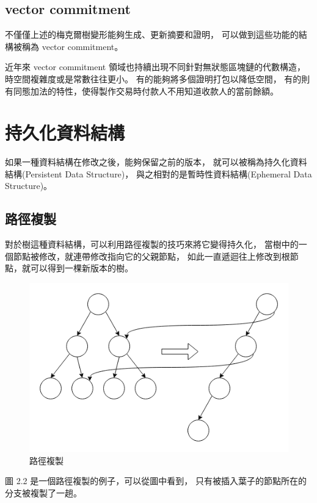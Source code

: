 \subsection{vector commitment}

不僅僅上述的梅克爾樹變形能夠生成、更新摘要和證明，
可以做到這些功能的結構被稱為 vector commitment\cite{catalano2013vector}。

近年來 vector commitment 領域也持續出現不同針對無狀態區塊鏈的代數構造，
時空間複雜度或是常數往往更小。
有的能夠將多個證明打包以降低空間\cite{boneh2019batching}，
有的則有同態加法的特性，使得製作交易時付款人不用知道收款人的當前餘額\cite{chepurnoy2018edrax}。

\section{持久化資料結構}

如果一種資料結構在修改之後，能夠保留之前的版本，
就可以被稱為持久化資料結構\cite{driscoll1986making}(Persistent Data Structure)，
與之相對的是暫時性資料結構(Ephemeral Data Structure)。

\subsection{路徑複製}
對於樹這種資料結構，可以利用路徑複製的技巧來將它變得持久化，
當樹中的一個節點被修改，就連帶修改指向它的父親節點，
如此一直遞迴往上修改到根節點，就可以得到一棵新版本的樹。

\begin{figure}
\includegraphics[width=\textwidth]{../images/路徑複製.png}
\caption{路徑複製}
\end{figure}

圖 2.2 是一個路徑複製的例子，可以從圖中看到，
只有被插入葉子的節點所在的分支被複製了一趟。